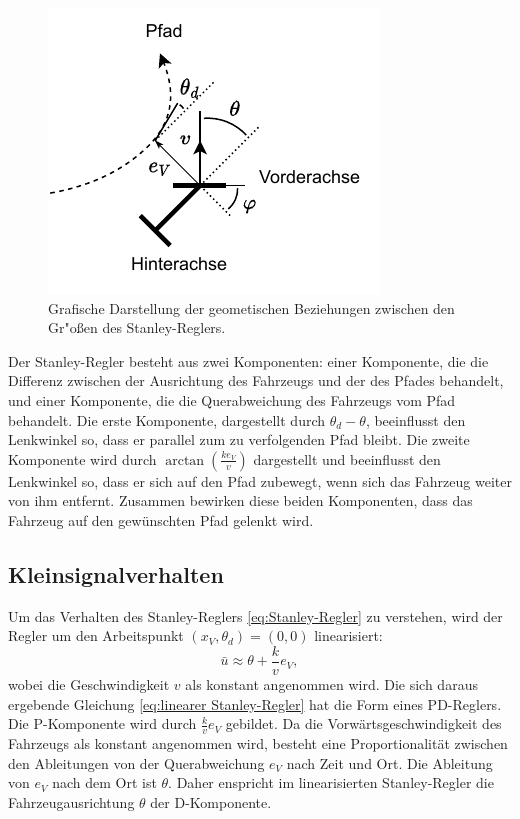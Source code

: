 \documentclass[arbeit=studie,oneside,BCOR=12mm]{ArbeitRST}
\begin{document}
\begin{figure}[h]
    \centering
    \includegraphics[scale=1.5]{stanley}
    \caption{Grafische Darstellung der geometischen Beziehungen zwischen
    den Gr"o{\ss}en des Stanley-Reglers.}
    \label{stanley}
\end{figure}

Der Stanley-Regler besteht aus zwei Komponenten: einer Komponente, die die
Differenz zwischen der Ausrichtung des Fahrzeugs und der des Pfades behandelt,
und einer Komponente, die die Querabweichung des Fahrzeugs vom Pfad behandelt.
Die erste Komponente, dargestellt durch $\theta_d - \theta$, beeinflusst den
Lenkwinkel so, dass er parallel zum zu verfolgenden Pfad bleibt. Die zweite
Komponente wird durch $\arctan(\frac{ke_{V}}{v})$ dargestellt und beeinflusst
den Lenkwinkel so, dass er sich auf den Pfad zubewegt, wenn sich das Fahrzeug
weiter von ihm entfernt. Zusammen bewirken diese beiden Komponenten, dass das
Fahrzeug auf den gewünschten Pfad gelenkt wird. \cite{steering-methods}


\subsection{Kleinsignalverhalten}


Um das Verhalten des Stanley-Reglers \eqref{eq:Stanley-Regler} zu verstehen,
wird der Regler um den Arbeitspunkt $\left(x_V, \theta_d\right) = \left(0,
0\right)$ linearisiert: 
\begin{equation} \bar{u} \approx \theta + \frac{k}{v}e_{V}, 
    \label{eq:linearer Stanley-Regler}
\end{equation}
wobei die Geschwindigkeit $v$ als konstant
angenommen wird. Die sich daraus ergebende Gleichung \eqref{eq:linearer
Stanley-Regler} hat die Form eines PD-Reglers. Die P-Komponente wird durch
\(\frac{k}{v}e_{V}\) gebildet. Da die Vorwärtsgeschwindigkeit des Fahrzeugs als
konstant angenommen wird, besteht eine Proportionalität zwischen den
Ableitungen von der Querabweichung \(e_{V}\) nach Zeit und Ort. Die Ableitung
von \(e_{V}\) nach dem Ort ist \(\theta\). Daher enspricht im linearisierten
Stanley-Regler die Fahrzeugausrichtung \(\theta\) der D-Komponente.
\end{document}
